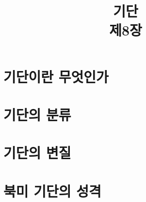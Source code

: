 \title[]{기단\\\small{제8장}}

\begin{frame}[plain] %
	\titlepage
\end{frame}


\section{기단이란 무엇인가}


\section{기단의 분류}

\section{기단의 변질}

\section{북미 기단의 성격}


